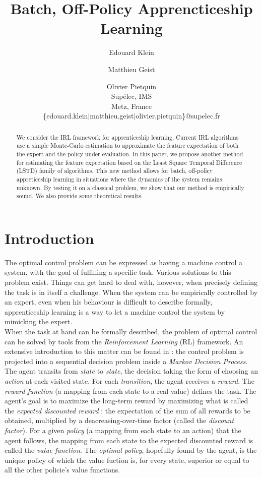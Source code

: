 \documentclass{article}
\title{Batch, Off-Policy Apprencticeship Learning}
\author{Edouard Klein \and Matthieu Geist \and Olivier Pietquin \\
Supélec, IMS\\
Metz, France \\
\{edouard.klein$|$matthieu.geist$|$olivier.pietquin\}@supelec.fr}
\begin{document}
\maketitle
\begin{abstract}
We consider the IRL framework for apprenticeship learning. %
Current IRL algorithms use a simple Monte-Carlo estimation to approximate the feature expectation of both the expert and the policy under evaluation. %
In this paper, we propose another method for estimating the feature expectation based on the Least Square Temporal Difference (LSTD) family of algorithms. %
This new method allows for batch, off-policy appreticeship learning in situations where the dynamics of the system remains unknown. %
By testing it on a classical problem, we show that our method is empirically sound.%
We also provide some theoretical results.%
\end{abstract}
\section{Introduction}
The optimal control problem can be expressed as having a machine control a system, with the goal of fulfilling a specific task. Various solutions to this problem exist. Things can get hard to deal with, however, when precisely defining the task is in itself a challenge. When the system can be empirically controlled by an expert, even when his behaviour is difficult to describe formally, apprenticeship learning is a way to let a machine control the system by mimicking the expert.\\

When the task at hand can be formally described, the problem of optimal control can be solved by tools from the \emph{Reinforcement Learning} (RL) framework. An extensive introduction to this matter can be found in \citep{sutton1998reinforcement} : the control problem is projected into a sequential decision problem inside a \emph{Markov Decision Process}. The agent transits from \emph{state} to \emph{state}, the decision taking the form of choosing an \emph{action} at each visited state. For each \emph{transition}, the agent receives a \emph{reward}. The \emph{reward function} (a mapping from each state to a real value) defines the task. The agent's goal is to maximize the long-term reward by maximizing what is called the \emph{expected discounted reward} : the expectation of the sum of all rewards to be obtained, multiplied by a deacreasing-over-time factor (called the \emph{discount factor}). For a given \emph{policy} (a mapping from each state to an action) that the agent follows, the mapping from each state to the expected discounted reward is called the \emph{value function}. The \emph{optimal policy}, hopefully found by the agent, is the unique policy of which the value fuction is, for every state, superior or equal to all the other policie's value functions.\\
\end{document}
